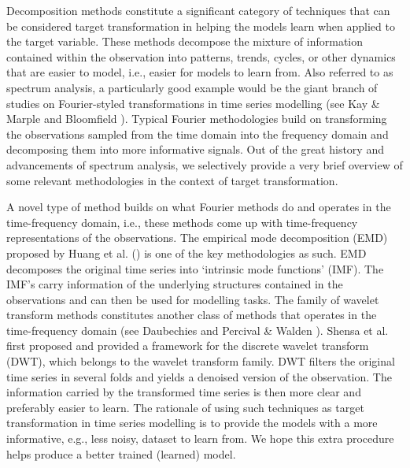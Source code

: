 Decomposition methods constitute a significant category of techniques that can be considered target transformation in helping the models learn when applied to the target variable. These methods decompose the mixture of information contained within the observation into patterns, trends, cycles, or other dynamics that are easier to model, i.e., easier for models to learn from. Also referred to as spectrum analysis, a particularly good example would be the giant branch of studies on Fourier-styled transformations in time series modelling (see Kay \& Marple \citeyear{kay1981spectrum} and Bloomfield \citeyear{bloomfield2004fourier}). Typical Fourier methodologies build on transforming the observations sampled from the time domain into the frequency domain and decomposing them into more informative signals. Out of the great history and advancements of spectrum analysis, we selectively provide a very brief overview of some relevant methodologies in the context of target transformation.

A novel type of method builds on what Fourier methods do and operates in the time-frequency domain, i.e., these methods come up with time-frequency representations of the observations. The empirical mode decomposition (EMD) proposed by Huang et al. (\citeyear{huang1998empirical}) is one of the key methodologies as such. EMD decomposes the original time series into `intrinsic mode functions' (IMF). The IMF's carry information of the underlying structures contained in the observations and can then be used for modelling tasks. The family of wavelet transform methods constitutes another class of methods that operates in the time-frequency domain (see Daubechies \citeyear{daubechies1992ten} and Percival \& Walden \citeyear{percival2000wavelet}). Shensa et al. \citeyear{shensa1992discrete} first proposed and provided a framework for the discrete wavelet transform (DWT), which belongs to the wavelet transform family. DWT filters the original time series in several folds and yields a denoised version of the observation. The information carried by the transformed time series is then more clear and preferably easier to learn. The rationale of using such techniques as target transformation in time series modelling is to provide the models with a more informative, e.g., less noisy, dataset to learn from. We hope this extra procedure helps produce a better trained (learned) model.


